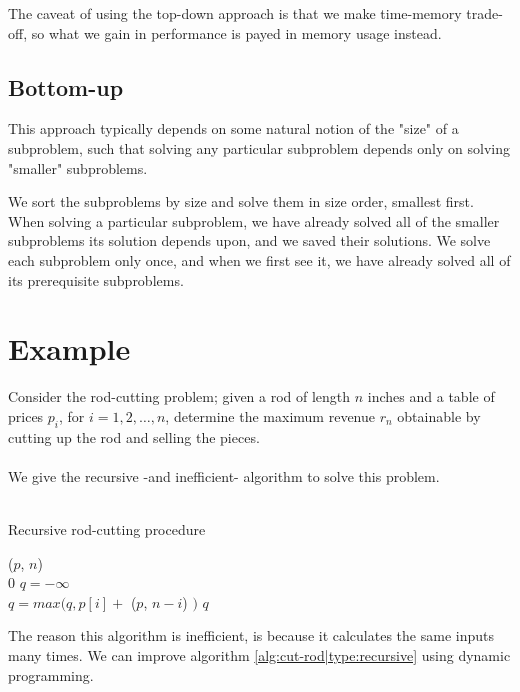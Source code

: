 The caveat of using the top-down approach is that we make time-memory
trade-off, so what we gain in performance is payed in memory usage instead.

\subsection{Bottom-up}
This approach typically depends on some natural notion of the "size" of a
subproblem, such that solving any particular subproblem depends only on
solving "smaller" subproblems.

We sort the subproblems by size and solve them in size order, smallest first.
When solving a particular subproblem, we have already solved all of the
smaller subproblems its solution depends upon, and we saved their solutions.
We solve each subproblem only once, and when we first see it, we have already
solved all of its prerequisite subproblems.

\newpage
\section{Example}
Consider the rod-cutting problem; given a rod of length $n$ inches and a table
of prices $p_i$, for $i = 1, 2, \dots, n$, determine the maximum revenue $r_n$
obtainable by cutting up the rod and selling the pieces.
\\\\
We give the recursive -and inefficient- algorithm to solve this problem. \\\\
\begin{algorithm}[H]
	\caption{Recursive rod-cutting procedure}
	\label{alg:cut-rod|type:recursive}
	
	
	
	
	\BlankLine
	\CutRod($p$, $n$) \\
	\Begin
	{
		{
			\Return $0$
		}
		$q = -\infty$ \\
		{
			$q = max(q, p[i] + $ \CutRod($p$, $n-i$) $)$
		}
		\Return $q$
	}
\end{algorithm}
The reason this algorithm is inefficient, is because it calculates the same
inputs many times. We can improve algorithm \ref{alg:cut-rod|type:recursive}
using dynamic programming.

